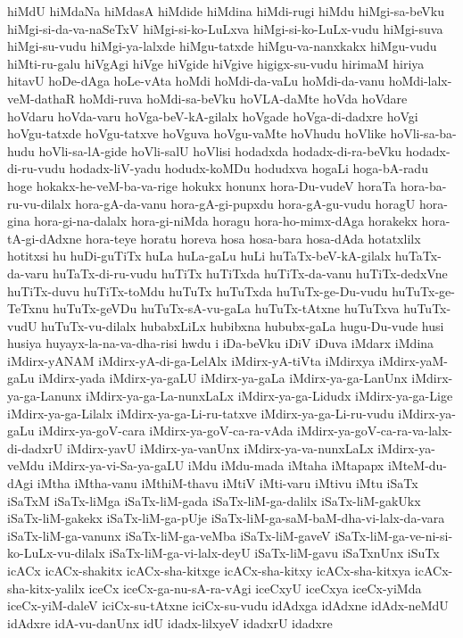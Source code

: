 {hiMdU
hiMdaNa
hiMdasA
hiMdide
hiMdina
hiMdi-rugi
hiMdu
hiMgi-sa-beVku
hiMgi-si-da-va-naSeTxV
hiMgi-si-ko-LuLxva
hiMgi-si-ko-LuLx-vudu
hiMgi-suva
hiMgi-su-vudu
hiMgi-ya-lalxde
hiMgu-tatxde
hiMgu-va-nanxkakx
hiMgu-vudu
hiMti-ru-galu
hiVgAgi
hiVge
hiVgide
hiVgive
higigx-su-vudu
hirimaM
hiriya
hitavU
hoDe-dAga
hoLe-vAta
hoMdi
hoMdi-da-vaLu
hoMdi-da-vanu
hoMdi-lalx-veM-dathaR
hoMdi-ruva
hoMdi-sa-beVku
hoVLA-daMte
hoVda
hoVdare
hoVdaru
hoVda-varu
hoVga-beV-kA-gilalx
hoVgade
hoVga-di-dadxre
hoVgi
hoVgu-tatxde
hoVgu-tatxve
hoVguva
hoVgu-vaMte
hoVhudu
hoVlike
hoVli-sa-ba-hudu
hoVli-sa-lA-gide
hoVli-salU
hoVlisi
hodadxda
hodadx-di-ra-beVku
hodadx-di-ru-vudu
hodadx-liV-yadu
hodudx-koMDu
hodudxva
hogaLi
hoga-bA-radu
hoge
hokakx-he-veM-ba-va-rige
hokukx
honunx
hora-Du-vudeV
horaTa
hora-ba-ru-vu-dilalx
hora-gA-da-vanu
hora-gA-gi-pupxdu
hora-gA-gu-vudu
horagU
hora-gina
hora-gi-na-dalalx
hora-gi-niMda
horagu
hora-ho-mimx-dAga
horakekx
hora-tA-gi-dAdxne
hora-teye
horatu
horeva
hosa
hosa-bara
hosa-dAda
hotatxlilx
hotitxsi
hu
huDi-guTiTx
huLa
huLa-gaLu
huLi
huTaTx-beV-kA-gilalx
huTaTx-da-varu
huTaTx-di-ru-vudu
huTiTx
huTiTxda
huTiTx-da-vanu
huTiTx-dedxVne
huTiTx-duvu
huTiTx-toMdu
huTuTx
huTuTxda
huTuTx-ge-Du-vudu
huTuTx-ge-TeTxnu
huTuTx-geVDu
huTuTx-sA-vu-gaLa
huTuTx-tAtxne
huTuTxva
huTuTx-vudU
huTuTx-vu-dilalx
hubabxLiLx
hubibxna
hububx-gaLa
hugu-Du-vude
husi
husiya
huyayx-la-na-va-dha-risi
hwdu
i
iDa-beVku
iDiV
iDuva
iMdarx
iMdina
iMdirx-yANAM
iMdirx-yA-di-ga-LelAlx
iMdirx-yA-tiVta
iMdirxya
iMdirx-yaM-gaLu
iMdirx-yada
iMdirx-ya-gaLU
iMdirx-ya-gaLa
iMdirx-ya-ga-LanUnx
iMdirx-ya-ga-Lanunx
iMdirx-ya-ga-La-nunxLaLx
iMdirx-ya-ga-Lidudx
iMdirx-ya-ga-Lige
iMdirx-ya-ga-Lilalx
iMdirx-ya-ga-Li-ru-tatxve
iMdirx-ya-ga-Li-ru-vudu
iMdirx-ya-gaLu
iMdirx-ya-goV-cara
iMdirx-ya-goV-ca-ra-vAda
iMdirx-ya-goV-ca-ra-va-lalx-di-dadxrU
iMdirx-yavU
iMdirx-ya-vanUnx
iMdirx-ya-va-nunxLaLx
iMdirx-ya-veMdu
iMdirx-ya-vi-Sa-ya-gaLU
iMdu
iMdu-mada
iMtaha
iMtapapx
iMteM-du-dAgi
iMtha
iMtha-vanu
iMthiM-thavu
iMtiV
iMti-varu
iMtivu
iMtu
iSaTx
iSaTxM
iSaTx-liMga
iSaTx-liM-gada
iSaTx-liM-ga-dalilx
iSaTx-liM-gakUkx
iSaTx-liM-gakekx
iSaTx-liM-ga-pUje
iSaTx-liM-ga-saM-baM-dha-vi-lalx-da-vara
iSaTx-liM-ga-vanunx
iSaTx-liM-ga-veMba
iSaTx-liM-gaveV
iSaTx-liM-ga-ve-ni-si-ko-LuLx-vu-dilalx
iSaTx-liM-ga-vi-lalx-deyU
iSaTx-liM-gavu
iSaTxnUnx
iSuTx
icACx
icACx-shakitx
icACx-sha-kitxge
icACx-sha-kitxy
icACx-sha-kitxya
icACx-sha-kitx-yalilx
iceCx
iceCx-ga-nu-sA-ra-vAgi
iceCxyU
iceCxya
iceCx-yiMda
iceCx-yiM-daleV
iciCx-su-tAtxne
iciCx-su-vudu
idAdxga
idAdxne
idAdx-neMdU
idAdxre
idA-vu-danUnx
idU
idadx-lilxyeV
idadxrU
idadxre
}
